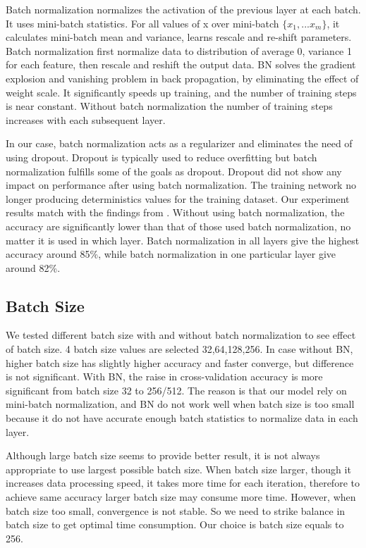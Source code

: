 \documentclass[journal,onecolumn]{IEEEtran}
\begin{document}
Batch normalization normalizes the activation of the previous layer at each batch. It uses mini-batch statistics. For all values of x over mini-batch $\{x_1, ... x_m\}$, it calculates mini-batch mean and variance, learns rescale and re-shift parameters. Batch normalization first normalize data to distribution of average 0, variance 1 for each feature, then rescale and reshift the output data. \cite{bn_paper} BN solves the gradient explosion and vanishing problem in back propagation, by eliminating the effect of weight scale. It significantly speeds up training, and the number of training steps is near constant. Without batch normalization the number of training steps increases with each subsequent layer.

In our case, batch normalization acts as a regularizer and eliminates the need of using dropout.  Dropout is typically used to reduce overfitting but batch normalization fulfills some of the goals as dropout. Dropout did not show any impact on performance after using batch normalization. The training network no longer producing deterministics values for the training dataset. Our experiment results match with the findings from \cite{bn}. Without using batch normalization, the accuracy are significantly lower than that of those used batch normalization, no matter it is used in which layer. Batch normalization in all layers give the highest accuracy around 85\%, while batch normalization in one particular layer give around 82\%.

\subsection{Batch Size}
We tested different batch size with and without batch normalization to see effect of batch size. 4 batch size values are selected {32,64,128,256}. 
In case without BN, higher batch size has slightly higher accuracy and faster converge, but difference is not significant. With BN, the raise in cross-validation accuracy is more significant from batch size 32 to 256/512. The reason is that our model rely on mini-batch normalization, and BN do not work well when batch size is too small because it do not have accurate enough batch statistics to normalize data in each layer.

Although large batch size seems to provide better result, it is not always appropriate to use largest possible batch size. When batch size larger, though it increases data processing speed, it takes more time for each iteration, therefore to achieve same accuracy larger batch size may consume more time. However, when batch size too small, convergence is not stable. So we need to strike balance in batch size to get optimal time consumption. Our choice is batch size equals to 256.
\end{document}
